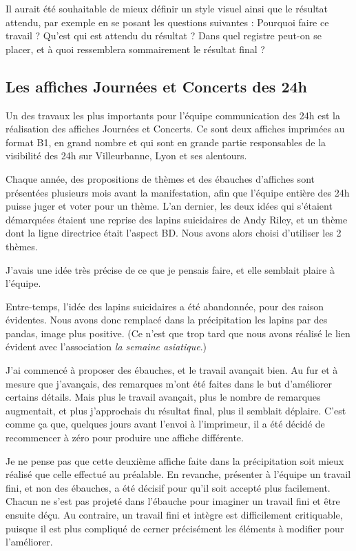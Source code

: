         Il aurait été souhaitable de mieux définir un style visuel ainsi que  le résultat attendu, par exemple en se posant les questions suivantes :
        Pourquoi faire ce travail ? Qu'est qui est attendu du résultat ? Dans quel registre peut-on se placer, et à quoi ressemblera sommairement le résultat final ?
        
    \subsection{Les affiches Journées et Concerts des 24h}
        
        Un des travaux les plus importants pour l'équipe communication des 24h est la réalisation des affiches Journées et Concerts.
        Ce sont deux affiches imprimées au format B1, en grand nombre et qui sont en grande partie responsables de la visibilité des 24h sur Villeurbanne, Lyon et ses alentours.
        
        Chaque année, des propositions de thèmes et des ébauches d'affiches sont présentées plusieurs mois avant la manifestation, afin que l'équipe entière des 24h puisse juger et voter pour un thème.
        L'an dernier, les deux idées qui s'étaient démarquées étaient une reprise des lapins suicidaires de Andy Riley, et un thème dont la ligne directrice était l'aspect BD.
        Nous avons alors choisi d'utiliser les 2 thèmes.

        J'avais une idée très précise de ce que je pensais faire, et elle semblait plaire à l'équipe.
        
        Entre-temps, l'idée des lapins suicidaires a été abandonnée, pour des raison évidentes.
        Nous avons donc remplacé dans la précipitation les lapins par des pandas, image plus positive. (Ce n'est que trop tard que nous avons réalisé le lien évident avec l'association \emph{la semaine asiatique}.)
        
        J'ai commencé à proposer des ébauches, et le travail avançait bien.
        Au fur et à mesure que j'avançais, des remarques m'ont été faites dans le but d'améliorer certains détails.
        Mais plus le travail avançait, plus le nombre de remarques augmentait, et plus j'approchais du résultat final, plus il semblait déplaire.
        C'est comme ça que, quelques jours avant l'envoi à l'imprimeur, il a été décidé de recommencer à zéro pour produire une affiche différente.
        
        Je ne pense pas que cette deuxième affiche faite dans la précipitation soit mieux réalisé que celle effectué au préalable.
        En revanche, présenter à l'équipe un travail fini, et non des ébauches, a été décisif pour qu'il soit  accepté plus facilement.
        Chacun ne s'est pas projeté dans l'ébauche pour imaginer un travail fini et être ensuite  déçu.
        Au contraire, un travail fini et intègre est difficilement critiquable, puisque il est plus compliqué de cerner précisément les éléments à modifier pour l'améliorer.
        
